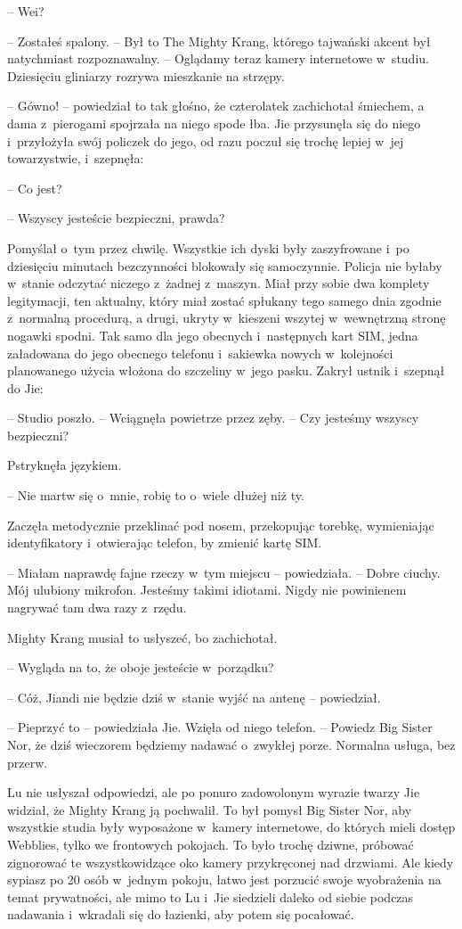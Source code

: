 \documentclass[oneside,polish,11pt,rmheadings]{mwbk}
\begin{document}
-- Wei?

-- Zostałeś spalony. -- Był to The Mighty Krang, którego tajwański akcent był natychmiast rozpoznawalny. -- Oglądamy teraz kamery internetowe w~studiu. Dziesięciu gliniarzy rozrywa mieszkanie na strzępy.

-- Gówno! -- powiedział to tak głośno, że czterolatek zachichotał śmiechem, a dama z~pierogami spojrzała na niego spode łba. Jie przysunęła się do niego i~przyłożyła swój policzek do jego, od razu poczuł się trochę lepiej w~jej towarzystwie, i~szepnęła: 

-- Co jest?

-- Wszyscy jesteście bezpieczni, prawda? 

Pomyślał o~tym przez chwilę. Wszystkie ich dyski były zaszyfrowane i~po dziesięciu minutach bezczynności blokowały się samoczynnie. Policja nie byłaby w~stanie odczytać niczego z~żadnej z~maszyn. Miał przy sobie dwa komplety legitymacji, ten aktualny, który miał zostać spłukany tego samego dnia zgodnie z~normalną procedurą, a drugi, ukryty w~kieszeni wszytej w~wewnętrzną stronę nogawki spodni. Tak samo dla jego obecnych i~następnych kart SIM, jedna załadowana do jego obecnego telefonu i~sakiewka nowych w~kolejności planowanego użycia włożona do szczeliny w~jego pasku. Zakrył ustnik i~szepnął do Jie: 

-- Studio poszło. -- Wciągnęła powietrze przez zęby. -- Czy jesteśmy wszyscy bezpieczni? 

Pstryknęła językiem. 

-- Nie martw się o~mnie, robię to o~wiele dłużej niż ty. 

Zaczęła metodycznie przeklinać pod nosem, przekopując torebkę, wymieniając identyfikatory i~otwierając telefon, by zmienić kartę SIM. 

-- Miałam naprawdę fajne rzeczy w~tym miejscu -- powiedziała. -- Dobre ciuchy. Mój ulubiony mikrofon. Jesteśmy takimi idiotami. Nigdy nie powinienem nagrywać tam dwa razy z~rzędu. 

Mighty Krang musiał to usłyszeć, bo zachichotał. 

-- Wygląda na to, że oboje jesteście w~porządku?

-- Cóż, Jiandi nie będzie dziś w~stanie wyjść na antenę -- powiedział.

-- Pieprzyć to -- powiedziała Jie. Wzięła od niego telefon. -- Powiedz Big Sister Nor, że dziś wieczorem będziemy nadawać o~zwykłej porze. Normalna usługa, bez przerw.

Lu nie usłyszał odpowiedzi, ale po ponuro zadowolonym wyrazie twarzy Jie widział, że Mighty Krang ją pochwalił. To był pomysł Big Sister Nor, aby wszystkie studia były wyposażone w~kamery internetowe, do których mieli dostęp Webblies, tylko we frontowych pokojach. To było trochę dziwne, próbować zignorować te wszystkowidzące oko kamery przykręconej nad drzwiami. Ale kiedy sypiasz po 20 osób w~jednym pokoju, łatwo jest porzucić swoje wyobrażenia na temat prywatności, ale mimo to Lu i~Jie siedzieli daleko od siebie podczas nadawania i~wkradali się do łazienki, aby potem się pocałować.
\end{document}
